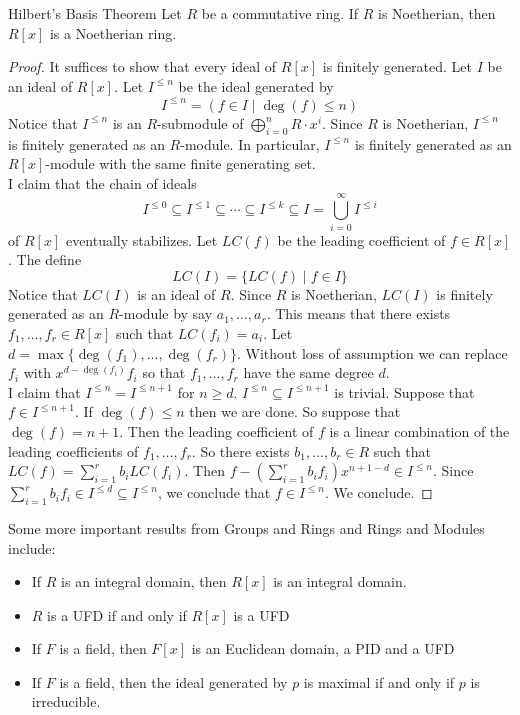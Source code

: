 \documentclass[a4paper]{article}
\begin{document}
\begin{thm}{Hilbert's Basis Theorem}{} Let $R$ be a commutative ring. If $R$ is Noetherian, then $R[x]$ is a Noetherian ring. 
\begin{proof}
It suffices to show that every ideal of $R[x]$ is finitely generated. Let $I$ be an ideal of $R[x]$. Let $I^{\leq n}$ be the ideal generated by $$I^{\leq n}=(f\in I\;|\;\deg(f)\leq n)$$ Notice that $I^{\leq n}$ is an $R$-submodule of $\bigoplus_{i=0}^nR\cdot x^i$. Since $R$ is Noetherian, $I^{\leq n}$ is finitely generated as an $R$-module. In particular, $I^{\leq n}$ is finitely generated as an $R[x]$-module with the same finite generating set. \\

I claim that the chain of ideals $$I^{\leq 0}\subseteq I^{\leq 1}\subseteq\cdots\subseteq I^{\leq k}\subseteq I=\bigcup_{i=0}^\infty I^{\leq i}$$ of $R[x]$ eventually stabilizes. Let $LC(f)$ be the leading coefficient of $f\in R[x]$. The define $$LC(I)=\{LC(f)\;|\;f\in I\}$$ Notice that $LC(I)$ is an ideal of $R$. Since $R$ is Noetherian, $LC(I)$ is finitely generated as an $R$-module by say $a_1,\dots,a_r$. This means that there exists $f_1,\dots,f_r\in R[x]$ such that $LC(f_i)=a_i$. Let $d=\max\{\deg(f_1),\dots,\deg(f_r)\}$. Without loss of assumption we can replace $f_i$ with $x^{d-\deg(f_i)}f_i$ so that $f_1,\dots,f_r$ have the same degree $d$. \\

I claim that $I^{\leq n}=I^{\leq n+1}$ for $n\geq d$. $I^{\leq n}\subseteq I^{\leq n+1}$ is trivial. Suppose that $f\in I^{\leq n+1}$. If $\deg(f)\leq n$ then we are done. So suppose that $\deg(f)=n+1$. Then the leading coefficient of $f$ is a linear combination of the leading coefficients of $f_1,\dots,f_r$. So there exists $b_1,\dots,b_r\in R$ such that $LC(f)=\sum_{i=1}^rb_iLC(f_i)$. Then $f-\left(\sum_{i=1}^rb_if_i\right)x^{n+1-d}\in I^{\leq n}$. Since $\sum_{i=1}^rb_if_i\in I^{\leq d}\subseteq I^{\leq n}$, we conclude that $f\in I^{\leq n}$. We conclude. 
\end{proof}
\end{thm}

Some more important results from Groups and Rings and Rings and Modules include: 
\begin{itemize}
\item If $R$ is an integral domain, then $R[x]$ is an integral domain. 
\item $R$ is a UFD if and only if $R[x]$ is a UFD
\item If $F$ is a field, then $F[x]$ is an Euclidean domain, a PID and a UFD
\item If $F$ is a field, then the ideal generated by $p$ is maximal if and only if $p$ is irreducible. 
\end{itemize}
\end{document}
